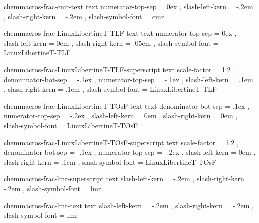  {chemmacros-frac-cmr-text} {text}
  {
    numerator-top-sep   = 0ex ,
    slash-left-kern     = -.2em ,
    slash-right-kern    = -.2em ,
    slash-symbol-font   = cmr
  }

 {chemmacros-frac-LinuxLibertineT-TLF-text} {text}
  {
    numerator-top-sep   = 0ex ,
    slash-left-kern     = 0em ,
    slash-right-kern    = .05em ,
    slash-symbol-font   = LinuxLibertineT-TLF
  }

 {chemmacros-frac-LinuxLibertineT-TLF-superscript} {text}
  {
    scale-factor        = 1.2 ,
    denominator-bot-sep = -.1ex ,
    numerator-top-sep   = -.1ex ,
    slash-left-kern     = .1em ,
    slash-right-kern    = .1em ,
    slash-symbol-font   = LinuxLibertineT-TLF
  }

 {chemmacros-frac-LinuxLibertineT-TOsF-text} {text}
  {
    denominator-bot-sep = .1ex ,
    numerator-top-sep   = -.2ex ,
    slash-left-kern     = 0em ,
    slash-right-kern    = 0em ,
    slash-symbol-font   = LinuxLibertineT-TOsF
  }

 {chemmacros-frac-LinuxLibertineT-TOsF-superscript} {text}
  {
    scale-factor        = 1.2 ,
    denominator-bot-sep = -.1ex ,
    numerator-top-sep   = -.2ex ,
    slash-left-kern     = 0em ,
    slash-right-kern    = .1em ,
    slash-symbol-font   = LinuxLibertineT-TOsF
  }

 {chemmacros-frac-lmr-superscript} {text}
  {
    slash-left-kern     = -.2em ,
    slash-right-kern    = -.2em ,
    slash-symbol-font   = lmr
  }

 {chemmacros-frac-lmr-text} {text}
  {
    slash-left-kern     = -.2em ,
    slash-right-kern    = -.2em ,
    slash-symbol-font   = lmr
  }

